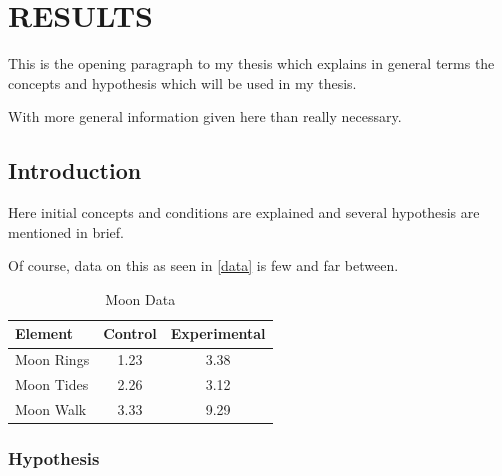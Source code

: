 \chapter{RESULTS}

This is the opening paragraph to my thesis which
explains in general terms the concepts and hypothesis
which will be used in my thesis.

With more general information given here than really
necessary.

\section{Introduction}

Here initial concepts and conditions are explained and
several hypothesis are mentioned in brief.

Of course, data on this as seen in \autoref{data}
is few and far between.

\begin{table}[h!tb] \centering
    \caption{Moon Data}
    \label{data}
    \begin{tabular}{lcc} \hline
        \textbf{Element} & \textbf{Control} & \textbf{Experimental} \\ \hline
        Moon Rings       & 1.23             & 3.38                  \\
        Moon Tides       & 2.26             & 3.12                  \\
        Moon Walk        & 3.33             & 9.29                  \\ \hline
    \end{tabular}
\end{table}

\subsection{Hypothesis}


